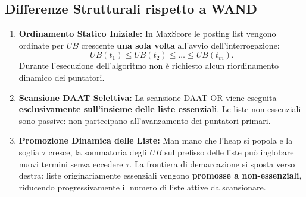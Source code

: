 \FloatBarrier
\subsection{Differenze Strutturali rispetto a WAND}
\begin{enumerate}
    \item \textbf{Ordinamento Statico Iniziale:} In MaxScore le posting list vengono ordinate per $UB$ crescente \textbf{una sola volta} all'avvio dell'interrogazione:
    \begin{equation}
        UB(t_1) \le UB(t_2) \le \dots \le UB(t_m).
    \end{equation}
    Durante l'esecuzione dell'algoritmo non \`e richiesto alcun riordinamento dinamico dei puntatori.
    \item \textbf{Scansione DAAT Selettiva:} La scansione DAAT OR viene eseguita \textbf{esclusivamente sull'insieme delle liste essenziali}. Le liste non-essenziali sono passive: non partecipano all'avanzamento dei puntatori primari.
    \item \textbf{Promozione Dinamica delle Liste:} Man mano che l'heap si popola e la soglia $\tau$ cresce, la sommatoria degli $UB$ sul prefisso delle liste pu\`o inglobare nuovi termini senza eccedere $\tau$. La frontiera di demarcazione si sposta verso destra: liste originariamente essenziali vengono \textbf{promosse a non-essenziali}, riducendo progressivamente il numero di liste attive da scansionare.
\end{enumerate}

\FloatBarrier
